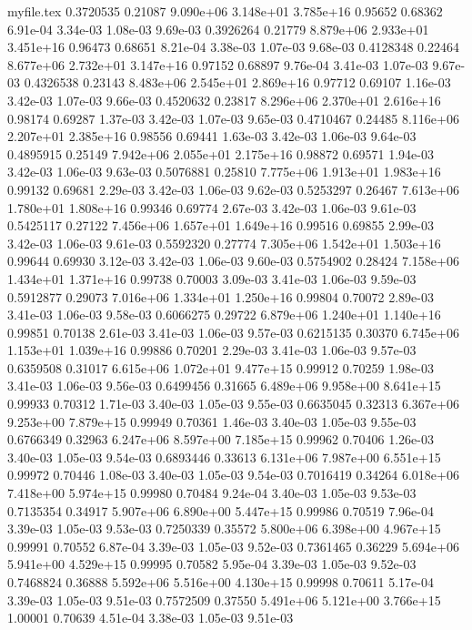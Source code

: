 \begin{filecontents}{myfile.tex}
0.3720535 0.21087 9.090e+06 3.148e+01 3.785e+16 0.95652 0.68362 6.91e-04 3.34e-03 1.08e-03 9.69e-03
0.3926264 0.21779 8.879e+06 2.933e+01 3.451e+16 0.96473 0.68651 8.21e-04 3.38e-03 1.07e-03 9.68e-03
0.4128348 0.22464 8.677e+06 2.732e+01 3.147e+16 0.97152 0.68897 9.76e-04 3.41e-03 1.07e-03 9.67e-03
0.4326538 0.23143 8.483e+06 2.545e+01 2.869e+16 0.97712 0.69107 1.16e-03 3.42e-03 1.07e-03 9.66e-03
0.4520632 0.23817 8.296e+06 2.370e+01 2.616e+16 0.98174 0.69287 1.37e-03 3.42e-03 1.07e-03 9.65e-03
0.4710467 0.24485 8.116e+06 2.207e+01 2.385e+16 0.98556 0.69441 1.63e-03 3.42e-03 1.06e-03 9.64e-03
0.4895915 0.25149 7.942e+06 2.055e+01 2.175e+16 0.98872 0.69571 1.94e-03 3.42e-03 1.06e-03 9.63e-03
0.5076881 0.25810 7.775e+06 1.913e+01 1.983e+16 0.99132 0.69681 2.29e-03 3.42e-03 1.06e-03 9.62e-03
0.5253297 0.26467 7.613e+06 1.780e+01 1.808e+16 0.99346 0.69774 2.67e-03 3.42e-03 1.06e-03 9.61e-03
0.5425117 0.27122 7.456e+06 1.657e+01 1.649e+16 0.99516 0.69855 2.99e-03 3.42e-03 1.06e-03 9.61e-03
0.5592320 0.27774 7.305e+06 1.542e+01 1.503e+16 0.99644 0.69930 3.12e-03 3.42e-03 1.06e-03 9.60e-03
0.5754902 0.28424 7.158e+06 1.434e+01 1.371e+16 0.99738 0.70003 3.09e-03 3.41e-03 1.06e-03 9.59e-03
0.5912877 0.29073 7.016e+06 1.334e+01 1.250e+16 0.99804 0.70072 2.89e-03 3.41e-03 1.06e-03 9.58e-03
0.6066275 0.29722 6.879e+06 1.240e+01 1.140e+16 0.99851 0.70138 2.61e-03 3.41e-03 1.06e-03 9.57e-03
0.6215135 0.30370 6.745e+06 1.153e+01 1.039e+16 0.99886 0.70201 2.29e-03 3.41e-03 1.06e-03 9.57e-03
0.6359508 0.31017 6.615e+06 1.072e+01 9.477e+15 0.99912 0.70259 1.98e-03 3.41e-03 1.06e-03 9.56e-03
0.6499456 0.31665 6.489e+06 9.958e+00 8.641e+15 0.99933 0.70312 1.71e-03 3.40e-03 1.05e-03 9.55e-03
0.6635045 0.32313 6.367e+06 9.253e+00 7.879e+15 0.99949 0.70361 1.46e-03 3.40e-03 1.05e-03 9.55e-03
0.6766349 0.32963 6.247e+06 8.597e+00 7.185e+15 0.99962 0.70406 1.26e-03 3.40e-03 1.05e-03 9.54e-03
0.6893446 0.33613 6.131e+06 7.987e+00 6.551e+15 0.99972 0.70446 1.08e-03 3.40e-03 1.05e-03 9.54e-03
0.7016419 0.34264 6.018e+06 7.418e+00 5.974e+15 0.99980 0.70484 9.24e-04 3.40e-03 1.05e-03 9.53e-03
0.7135354 0.34917 5.907e+06 6.890e+00 5.447e+15 0.99986 0.70519 7.96e-04 3.39e-03 1.05e-03 9.53e-03
0.7250339 0.35572 5.800e+06 6.398e+00 4.967e+15 0.99991 0.70552 6.87e-04 3.39e-03 1.05e-03 9.52e-03
0.7361465 0.36229 5.694e+06 5.941e+00 4.529e+15 0.99995 0.70582 5.95e-04 3.39e-03 1.05e-03 9.52e-03
0.7468824 0.36888 5.592e+06 5.516e+00 4.130e+15 0.99998 0.70611 5.17e-04 3.39e-03 1.05e-03 9.51e-03
0.7572509 0.37550 5.491e+06 5.121e+00 3.766e+15 1.00001 0.70639 4.51e-04 3.38e-03 1.05e-03 9.51e-03

\end{filecontents}

